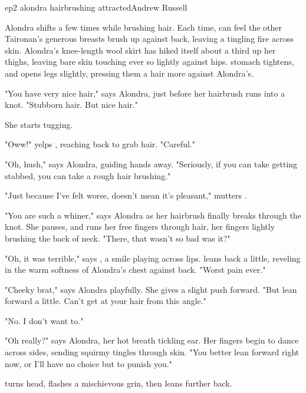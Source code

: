 \documentclass{book}
\begin{document}
\begin{childnode}{ep2 alondra hairbrushing attracted}{Andrew Russell}


    Alondra shifts a few times while brushing \names{} hair. Each time, \name{} can feel the other Taironan's generous breasts brush up 
    against \hisher{} 
    back, leaving a tingling fire across \hisher{} skin. Alondra's knee-length wool skirt has hiked itself about a third up her thighs, leaving 
    bare 
    skin
    touching ever so lightly against \names{} hips. \names{} stomach tightens, and \heshe{} opens \hisher{} legs slightly, pressing them a hair more against Alondra's.

    "You have very nice hair," says Alondra, just before her hairbrush runs into a knot. "Stubborn hair. But nice hair." 
    
    She starts tugging.

    "Oww!" yelps \name{}, reaching back to grab \hisher{} hair. "Careful."

    "Oh, hush," says Alondra, guiding \names{} hands away. "Seriously, if you can take getting stabbed, you can take a rough hair brushing."

    "Just because I've felt worse, doesn't mean it's pleasant," mutters \name{}.

    "You are such a whiner," says Alondra as her hairbrush finally breaks through the knot. She pauses, and runs her free fingers through \names{} hair, her fingers lightly brushing the back
    of \hisher{} neck. "There, that wasn't so bad was it?"

    "Oh, it was terrible," says \name{}, a smile playing across \hisher{} lips. \HeShe{} leans back a little, reveling in the warm softness of Alondra's chest against \hisher{} back. "Worst pain ever."
    
    "Cheeky brat," says Alondra playfully. She gives \name{} a slight push forward. "But lean forward a little. Can't get at your hair from this angle."

    "No. I don't want to."

    "Oh really?" says Alondra, her hot breath tickling \names{} ear. Her fingers begin to dance across \names{} sides, sending squirmy tingles through \names{} skin. "You better 
    lean forward right now, or I'll have no choice but to punish you."

    \name{} turns \hisher{} head, flashes a mischievous grin, then leans further back.


\end{childnode}
\end{document}
